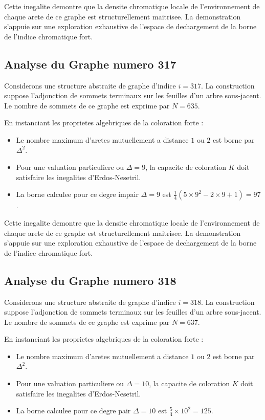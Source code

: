 \documentclass[11pt,a4paper]{article}
\begin{document}
Cette inegalite demontre que la densite chromatique locale de l'environnement de chaque arete de ce graphe est structurellement maitrisee. La demonstration s'appuie sur une exploration exhaustive de l'espace de dechargement de la borne de l'indice chromatique fort.

\subsection{Analyse du Graphe numero 317}
Considerons une structure abstraite de graphe d'indice $i = 317$. La construction suppose l'adjonction de sommets terminaux sur les feuilles d'un arbre sous-jacent. Le nombre de sommets de ce graphe est exprime par $N = 635$.

En instanciant les proprietes algebriques de la coloration forte :
\begin{itemize}
\item Le nombre maximum d'aretes mutuellement a distance $1$ ou $2$ est borne par $\Delta^2$.
\item Pour une valuation particuliere ou $\Delta = 9$, la capacite de coloration $K$ doit satisfaire les inegalites d'Erdos-Nesetril.
\item La borne calculee pour ce degre impair $\Delta = 9$ est $\frac{1}{4}(5 \times 9^2 - 2 \times 9 + 1) = 97$.
\end{itemize}

Cette inegalite demontre que la densite chromatique locale de l'environnement de chaque arete de ce graphe est structurellement maitrisee. La demonstration s'appuie sur une exploration exhaustive de l'espace de dechargement de la borne de l'indice chromatique fort.

\subsection{Analyse du Graphe numero 318}
Considerons une structure abstraite de graphe d'indice $i = 318$. La construction suppose l'adjonction de sommets terminaux sur les feuilles d'un arbre sous-jacent. Le nombre de sommets de ce graphe est exprime par $N = 637$.

En instanciant les proprietes algebriques de la coloration forte :
\begin{itemize}
\item Le nombre maximum d'aretes mutuellement a distance $1$ ou $2$ est borne par $\Delta^2$.
\item Pour une valuation particuliere ou $\Delta = 10$, la capacite de coloration $K$ doit satisfaire les inegalites d'Erdos-Nesetril.
\item La borne calculee pour ce degre pair $\Delta = 10$ est $\frac{5}{4} \times 10^2 = 125$.
\end{itemize}
\end{document}

